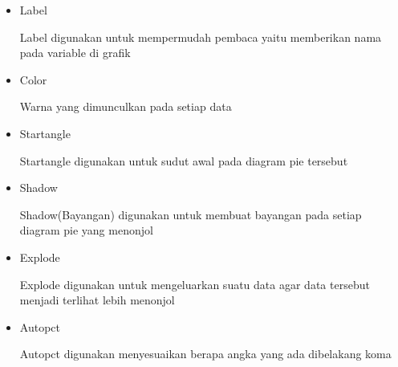 \begin{enumerate}
\begin{itemize}
    \item Label
    
    Label digunakan untuk mempermudah pembaca yaitu memberikan nama pada variable di grafik
    
    \item Color
    
    Warna yang dimunculkan pada setiap data
    
    \item Startangle
    
    Startangle digunakan untuk sudut awal pada diagram pie tersebut
    
    \item Shadow
    
    Shadow(Bayangan) digunakan untuk membuat bayangan pada setiap diagram pie yang menonjol
    
    \item Explode

    Explode digunakan untuk mengeluarkan suatu data agar data tersebut menjadi terlihat lebih menonjol
    
    \item Autopct
    
    Autopct digunakan menyesuaikan berapa angka yang ada dibelakang koma
\end{itemize}
\end{enumerate}